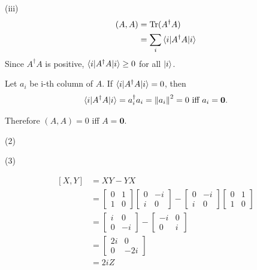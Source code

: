 (iii)
\begin{align*}
	(A, A) &= \operatorname{Tr} (A^\dagger A)\\
		&= \sum_i \braket{ i | A^\dagger A | i }
\end{align*}
Since $A^\dagger A$ is positive, $\braket{ i | A^\dagger A | i } \geq 0$ for all $\ket{ i }$.


Let $a_i$ be i-th column of $A$.
If $\braket{ i | A^\dagger A | i } = 0$, then
\begin{align*}
	\braket{ i | A^\dagger A | i } = a^\dagger_i a_i = \left\lVert a_i\right\rVert^2 = 0 \text{ iff }a_i = \mathbf{0}.
\end{align*}

Therefore $(A, A) = 0$ iff $A = \mathbf{0}$.

\vspace{5mm}
(2)

(3)


%
%

\begin{align*}
	\left[X, Y \right] &=XY - YX\\	
		&= \begin{bmatrix}
		0 & 1 \\ 
		1 & 0
		\end{bmatrix}
		\begin{bmatrix}
		0 & -i \\ 
		i & 0
		\end{bmatrix}
		-
		\begin{bmatrix}
		0 & -i \\ 
		i & 0
		\end{bmatrix}
		\begin{bmatrix}
		0 & 1 \\ 
		1 & 0
		\end{bmatrix} \\
%
		&=
%
		\begin{bmatrix}
			i & 0 \\ 
			0 & -i
		\end{bmatrix}
		-
		\begin{bmatrix}
			-i & 0 \\ 
			0 & i
		\end{bmatrix}\\
%
		&=
%
		\begin{bmatrix}
			2i & 0 \\ 
			0 & -2i
		\end{bmatrix} \\
%
		&=	2i Z
\end{align*}



